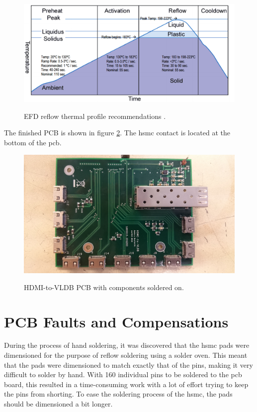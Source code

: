 \documentclass[main.tex]{subfiles}
\begin{document}
\begin{figure}[H] %
\includegraphics[width=0.8\linewidth]{../img/temp_prof}  \\[0.1 cm]
\caption{EFD reflow thermal profile recommendations \cite{krepro_reflow}.}
\label{fig:krepro}
\end{figure}

The finished PCB is shown in figure \ref{fig:pcb_1}. The \gls{hsmc} contact is located at the bottom of the \gls{pcb}.

\begin{figure}[H] %
\includegraphics[width=0.8\linewidth, trim={15cm 0 15cm 0},clip]{../img/pcb_1.JPG}  \\[0.1 cm]
\caption{HDMI-to-VLDB PCB with components soldered on.}
\label{fig:pcb_1}
\end{figure}

\section{PCB Faults and Compensations}

During the process of hand soldering, it was discovered that the \gls{hsmc} pads were dimensioned for the purpose of reflow soldering using a solder oven. This meant that the pads were dimensioned to match exactly that of the pins, making it very difficult to solder by hand. With 160 individual pins to be soldered to the \gls{pcb} board, this resulted in a time-consuming work with a lot of effort trying to keep the pins from shorting. To ease the soldering process of the \gls{hsmc}, the pads should be dimensioned a bit longer.
\end{document}
